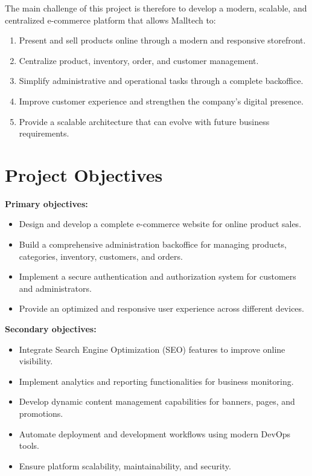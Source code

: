 The main challenge of this project is therefore to develop a modern, scalable, and centralized e-commerce platform that allows Malltech to:
\begin{enumerate}
    \item Present and sell products online through a modern and responsive storefront.
    \item Centralize product, inventory, order, and customer management.
    \item Simplify administrative and operational tasks through a complete backoffice.
    \item Improve customer experience and strengthen the company’s digital presence.
    \item Provide a scalable architecture that can evolve with future business requirements.
\end{enumerate}

\newpage

\section*{Project Objectives}

\textbf{Primary objectives:}
\begin{itemize}
    \item Design and develop a complete e-commerce website for online product sales.
    \item Build a comprehensive administration backoffice for managing products, categories, inventory, customers, and orders.
    \item Implement a secure authentication and authorization system for customers and administrators.
    \item Provide an optimized and responsive user experience across different devices.
\end{itemize}

\textbf{Secondary objectives:}
\begin{itemize}
    \item Integrate Search Engine Optimization (SEO) features to improve online visibility.
    \item Implement analytics and reporting functionalities for business monitoring.
    \item Develop dynamic content management capabilities for banners, pages, and promotions.
    \item Automate deployment and development workflows using modern DevOps tools.
    \item Ensure platform scalability, maintainability, and security.
\end{itemize}

